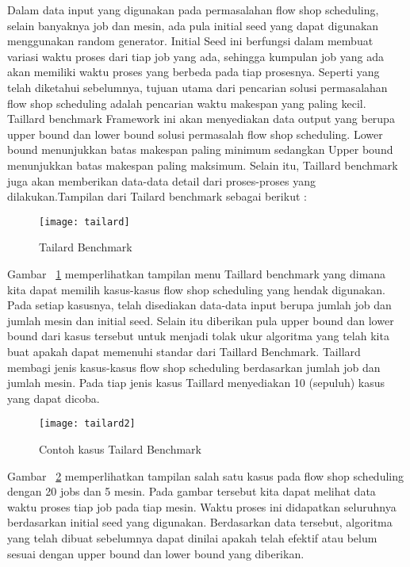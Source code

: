 Dalam data input yang digunakan pada permasalahan flow shop scheduling, selain banyaknya job dan mesin, ada pula initial seed yang dapat digunakan menggunakan random generator. Initial Seed ini berfungsi dalam membuat variasi waktu proses dari tiap job yang ada, sehingga kumpulan
job yang ada akan memiliki waktu proses yang berbeda pada tiap prosesnya. Seperti yang telah diketahui sebelumnya, tujuan utama dari pencarian solusi permasalahan flow shop scheduling adalah pencarian waktu makespan yang paling kecil. Taillard benchmark Framework
ini akan menyediakan data output yang berupa upper bound dan lower bound solusi permasalah
flow shop scheduling. Lower bound menunjukkan batas makespan paling minimum sedangkan Upper bound menunjukkan batas makespan paling maksimum. Selain itu, Taillard benchmark juga akan memberikan data-data detail dari proses-proses yang dilakukan.Tampilan dari Tailard benchmark sebagai berikut :

\begin{figure}[H]
	\centering
	\texttt{[image: tailard]}
	\caption[Tailard Benchmark] {Tailard Benchmark}
	\label{fig:tailard1}
\end{figure}
Gambar ~\ref{fig:tailard1} memperlihatkan tampilan menu Taillard benchmark yang dimana kita dapat memilih
kasus-kasus flow shop scheduling yang hendak digunakan. Pada setiap kasusnya, telah disediakan
data-data input berupa jumlah job dan jumlah mesin dan initial seed. Selain itu diberikan
pula upper bound dan lower bound dari kasus tersebut untuk menjadi tolak ukur algoritma yang
telah kita buat apakah dapat memenuhi standar dari Taillard Benchmark.
Taillard membagi jenis kasus-kasus flow shop scheduling berdasarkan jumlah job dan jumlah
mesin. Pada tiap jenis kasus Taillard menyediakan 10 (sepuluh) kasus yang dapat dicoba.
\begin{figure}[H]
	\centering
	\texttt{[image: tailard2]}
	\caption[Contoh kasus Tailard Benchmark] {Contoh kasus Tailard Benchmark}
	\label{fig:tailard2}
\end{figure}
Gambar ~\ref{fig:tailard2} memperlihatkan tampilan salah satu kasus pada flow shop scheduling dengan 20
jobs dan 5 mesin. Pada gambar tersebut kita dapat melihat data waktu proses tiap job pada
tiap mesin. Waktu proses ini didapatkan seluruhnya berdasarkan initial seed yang digunakan.
Berdasarkan data tersebut, algoritma yang telah dibuat sebelumnya dapat dinilai apakah telah 
efektif atau belum sesuai dengan upper bound dan lower bound yang diberikan.











